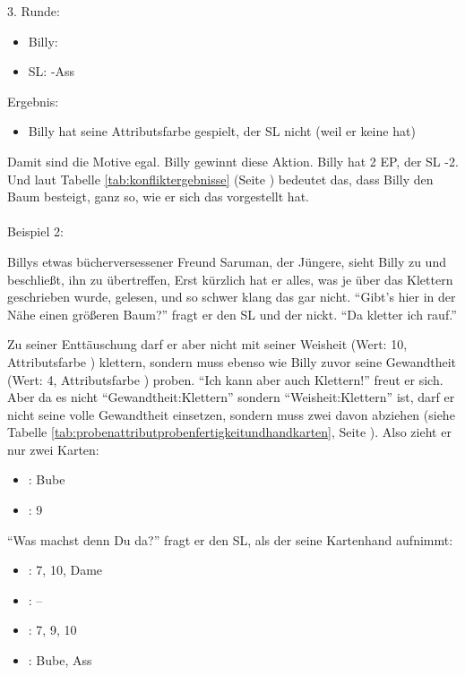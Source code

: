 3. Runde:
\begin {itemize}
\item Billy: 
\item SL: \kreuz-Ass
\end {itemize}

Ergebnis:
\begin {itemize}
\item Billy hat seine Attributsfarbe gespielt, der SL nicht (weil er keine hat)
\end {itemize}
Damit sind die Motive egal. Billy gewinnt diese Aktion. Billy hat 2 EP, der SL -2.
Und laut Tabelle \ref {tab:konfliktergebnisse} (Seite \pageref {tab:konfliktergebnisse})  bedeutet das, dass Billy den Baum besteigt, ganz so, wie er sich das vorgestellt hat.
\\
\\
Beispiel 2:

Billys etwas bücherversessener Freund Saruman, der Jüngere, sieht Billy zu und beschließt, ihn zu übertreffen, Erst kürzlich hat er alles, was je über das Klettern geschrieben wurde, gelesen, und so schwer klang das gar nicht. "`Gibt's hier in der Nähe einen größeren Baum?"' fragt er den SL und der nickt. "`Da kletter ich rauf."'

Zu seiner Enttäuschung darf er aber nicht mit seiner Weisheit (Wert: 10, Attributsfarbe \karo) klettern, sondern muss ebenso wie Billy zuvor seine Gewandtheit (Wert: 4, Attributsfarbe \kreuz) proben. "`Ich kann aber auch Klettern!"' freut er sich. Aber da es nicht "`Gewandtheit:Klettern"' sondern "`Weisheit:Klettern"' ist, darf er nicht seine volle Gewandtheit einsetzen, sondern muss zwei davon abziehen (siehe Tabelle \ref {tab:probenattributprobenfertigkeitundhandkarten}, Seite \pageref {tab:probenattributprobenfertigkeitundhandkarten}). Also zieht er nur zwei Karten:
\begin {itemize}
\item \karo: Bube
\item \kreuz: 9
\end {itemize}

"`Was machst denn Du da?"' fragt er den SL, als der seine Kartenhand aufnimmt:
\begin {itemize}
\item \herz: 7, 10, Dame
\item \karo: --
\item \pik: 7, 9, 10
\item \kreuz: Bube, Ass
\end {itemize}

